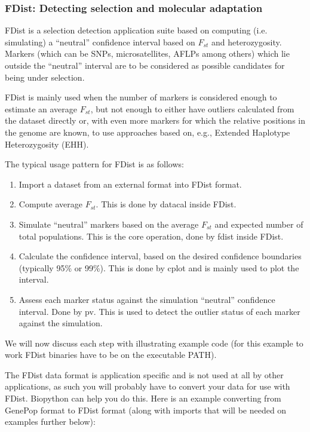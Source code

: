 \documentclass{report}
\begin{document}
\subsubsection{FDist: Detecting selection and molecular adaptation}

FDist is a selection detection application suite based on computing
(i.e. simulating) a ``neutral'' confidence interval based on $F_{st}$ and
heterozygosity. Markers (which can be SNPs, microsatellites, AFLPs
among others) which lie outside the ``neutral'' interval are to be
considered as possible candidates for being under selection.

FDist is mainly used when the number of markers is considered enough
to estimate an average $F_{st}$, but not enough to either have outliers
calculated from the dataset directly or, with even more markers for
which the relative positions in the genome are known, to use
approaches based on, e.g., Extended Haplotype Heterozygosity (EHH).


The typical usage pattern for FDist is as follows:

\begin{enumerate}
\item Import a dataset from an external format into FDist format.
\item Compute average $F_{st}$. This is done by datacal inside FDist.
\item Simulate ``neutral'' markers based on the
    average $F_{st}$ and expected number of total populations.
    This is the core operation, done by fdist inside FDist.
\item Calculate the confidence interval, based on the desired
    confidence boundaries (typically 95\% or 99\%). This is done by
    cplot and is mainly used to plot the interval.
\item Assess each marker status against the simulation ``neutral''
    confidence interval. Done
    by pv. This is used to detect the outlier status of each marker
    against the simulation.
\end{enumerate}


We will now discuss each step with illustrating example code
(for this example to work FDist binaries have to be on the
executable PATH).

The FDist data format is application specific and is not used at
all by other applications, as such you will probably have to convert
your data for use with FDist. Biopython can help you do this.
Here is an example converting from GenePop format to FDist format
(along with imports that will be needed on examples further below):
\end{document}
